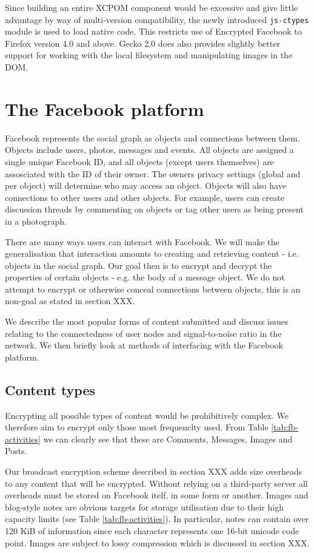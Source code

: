Since building an entire XCPOM component would be excessive and give little advantage by way of multi-version compatibility, the newly introduced {\tt js-ctypes} module is used to load native code. This restricts use of Encrypted Facebook to Firefox version 4.0 and above. Gecko 2.0 does also provides slightly better support for working with the local filesystem and manipulating images in the \ac{DOM}.


\FloatBarrier
\section{The Facebook platform}

Facebook represents the social graph as objects and connections between them. Objects include users, photos, messages and events. All objects are assigned a single unique Facebook ID, and all objects (except users themselves) are assosciated with the ID of their owner. The owners privacy settings (global and per object) will determine who may access an object. Objects will also have connections to other users and other objects. For example, users can create discussion threads by commenting on objects or tag other users as being present in a photograph.

There are many ways users can interact with Facebook. We will make the generalisation that interaction amounts to creating and retrieving content - i.e. objects in the social graph. Our goal then is to encrypt and decrypt the properties of certain objects - e.g. the body of a message object. We do not attempt to encrypt or otherwise conceal connections between objects, this is an non-goal as stated in section XXX.

We describe the most popular forms of content submitted and discuss issues relating to the connectedness of user nodes and signal-to-noise ratio in the network. We then briefly look at methods of interfacing with the Facebook platform.

\FloatBarrier
\subsection{Content types}

Encrypting all possible types of content would be prohibitively complex. We therefore aim to encrypt only those most frequenclty used. From Table \ref{tab:fb-activities} we can clearly see that these are Comments, Messages, Images and Posts. 

Our broadcast encryption scheme described in section XXX adds size overheads to any content that will be encrypted. Without relying on a third-party server all overheads must be stored on Facebook itelf, in some form or another. Images and blog-style notes are obvious targets for storage utilisation due to their high capacity limits (see Table \ref{tab:fb-activities}). In particular, notes can contain over 120 KiB of information since each character represents one 16-bit unicode code point. Images are subject to lossy compression which is discussed in section XXX.

